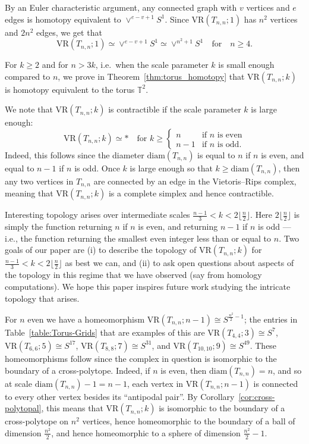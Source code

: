 \documentclass[12pt,a4paper]{amsart}
\theoremstyle{definition}
\newcommand{\T}{\ensuremath{\mathbb{T}}}
\newcommand{\vr}[2]{\mathrm{VR}(#1;#2)}
\newcommand{\diam}{\ensuremath{\mathrm{diam}}}
\numberwithin{equation}{section}
\begin{document}
By an Euler characteristic argument, any connected graph with $v$ vertices and $e$ edges is homotopy equivalent to $\vee^{e-v+1} S^1$.
Since $\vr{T_{n,n}}{1}$ has $n^2$ vertices and $2n^2$ edges, we get that 
\[
\vr{T_{n,n}}{1}\simeq \vee^{e-v+1} S^1\simeq \vee^{n^{2}+1}S^{1}\quad \text{for} \quad n\geq 4.
\]

For $k\ge 2$ and for $n>3k$, i.e.\ when the scale parameter $k$ is small enough compared to $n$, we prove in Theorem~\ref{thm:torus_homotopy} that $\vr{T_{n,n}}{k}$ is homotopy equivalent to the torus $\T^2$.

We note that $\vr{T_{n,n}}{k}$ is contractible if the scale parameter $k$ is large enough:
\[
\vr{T_{n,n}}{k}\simeq\ast \quad\text{for }k\ge
\begin{cases}
n &\text{if }n\text{ is even} \\
n-1 &\text{if }n\text{ is odd.}
\end{cases}
\]
Indeed, this follows since the diameter $\diam(T_{n,n})$ is equal to $n$ if $n$ is even, and equal to $n-1$ if $n$ is odd.
Once $k$ is large enough so that $k\ge \diam(T_{n,n})$, then any two vertices in $T_{n,n}$ are connected by an edge in the Vietoris--Rips complex, meaning that $\vr{T_{n,n}}{k}$ is a complete simplex and hence contractible.

Interesting topology arises over intermediate scales $\frac{n-1}{3}<k<2\lfloor\frac{n}{2}\rfloor$.
Here $2\lfloor\frac{n}{2}\rfloor$ is simply the function returning $n$ if $n$ is even, and returning $n-1$ if $n$ is odd --- i.e., the function returning the smallest even integer less than or equal to $n$.
Two goals of our paper are (i) to describe the topology of $\vr{T_{n,n}}{k}$ for $\frac{n-1}{3}<k<2\lfloor\frac{n}{2}\rfloor$ as best we can, and (ii) to ask open questions about aspects of the topology in this regime that we have observed (say from homology computations).
We hope this paper inspires future work studying the intricate topology that arises.

For $n$ even we have a homeomorphism $\vr{T_{n,n}}{n-1}\cong S^{\frac{n^2}{2}-1}$; the entries in Table~\ref{table:Torus-Grids} that are examples of this are $\vr{T_{4,4}}{3}\cong S^{7}$, $\vr{T_{6,6}}{5}\cong S^{17}$, $\vr{T_{8,8}}{7}\cong S^{31}$, and $\vr{T_{10,10}}{9}\cong S^{49}$.
These homeomorphisms follow since the complex in question is isomorphic to the boundary of a cross-polytope.
Indeed, if $n$ is even, then $\diam(T_{n,n})=n$, and so at scale $\diam(T_{n,n})-1 = n-1$, each vertex in $\vr{T_{n,n}}{n-1}$ is connected to every other vertex besides its ``antipodal pair''.
By Corollary~\ref{cor:cross-polytopal}, this means that $\vr{T_{n,n}}{k}$ is isomorphic to the boundary of a cross-polytope on $n^2$ vertices, hence homeomorphic to the boundary of a ball of dimension $\frac{n^2}{2}$, and hence homeomorphic to a sphere of dimension $\frac{n^2}{2}-1$.
\end{document}
